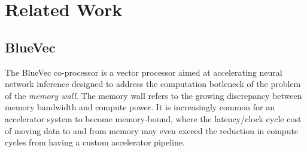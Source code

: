 \documentclass[a4paper,8pt]{report}
\begin{document}








\chapter{Related Work} 
\section{BlueVec}
The BlueVec\cite{bluevec} co-processor is a vector processor aimed at accelerating neural
network inference designed to address the computation botleneck of the problem
of the \emph{memory wall}.
The memory wall refers to the growing discrepancy between memory bandwidth and
compute power. It is increasingly common for an accelerator system to become
memory-bound, where the latency/clock cycle cost of moving data to and from
memory may even exceed the reduction in compute cycles from having a custom
accelerator pipeline.
\end{document}

